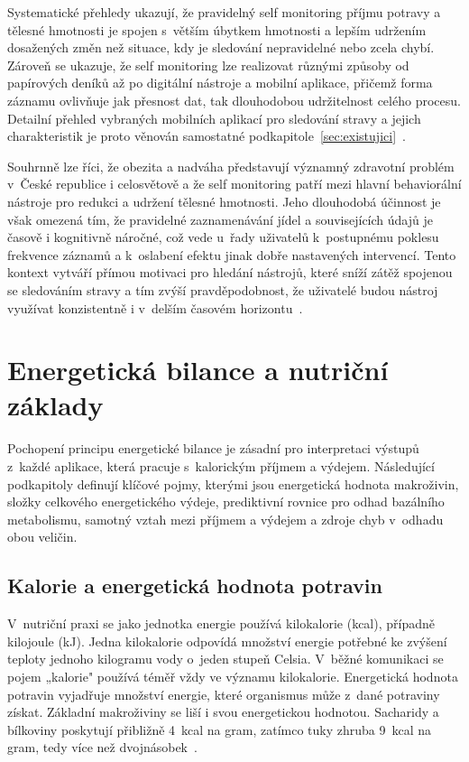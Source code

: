 Systematické přehledy ukazují, že pravidelný self monitoring příjmu potravy a tělesné hmotnosti je spojen s~větším úbytkem hmotnosti a lepším udržením dosažených změn než situace, kdy je sledování nepravidelné nebo zcela chybí.
Zároveň se ukazuje, že self monitoring lze realizovat různými způsoby od papírových deníků až po digitální nástroje a mobilní aplikace, přičemž forma záznamu ovlivňuje jak přesnost dat, tak dlouhodobou udržitelnost celého procesu.
Detailní přehled vybraných mobilních aplikací pro sledování stravy a jejich charakteristik je proto věnován samostatné podkapitole~\ref{sec:existujici}~\cite{ang2021efficacy,raber2021systematicReview}.

Souhrnně lze říci, že obezita a nadváha představují významný zdravotní problém v~České republice i celosvětově a že self monitoring patří mezi hlavní behaviorální nástroje pro redukci a udržení tělesné hmotnosti.
Jeho dlouhodobá účinnost je však omezená tím, že pravidelné zaznamenávání jídel a souvisejících údajů je časově i kognitivně náročné, což vede u~řady uživatelů k~postupnému poklesu frekvence záznamů a k~oslabení efektu jinak dobře nastavených intervencí.
Tento kontext vytváří přímou motivaci pro hledání nástrojů, které sníží zátěž spojenou se sledováním stravy a tím zvýší pravděpodobnost, že uživatelé budou nástroj využívat konzistentně i v~delším časovém horizontu~\cite{theodorakis2025humanEnergyBalance,pujia2025roleMobileApps,crane2023patterns}.

\section{Energetická bilance a nutriční základy}
\label{sec:energetickaBilance}

Pochopení principu energetické bilance je zásadní pro interpretaci výstupů z~každé aplikace, která pracuje s~kalorickým příjmem a výdejem.
Následující podkapitoly definují klíčové pojmy, kterými jsou energetická hodnota makroživin, složky celkového energetického výdeje, prediktivní rovnice pro odhad bazálního metabolismu, samotný vztah mezi příjmem a výdejem a zdroje chyb v~odhadu obou veličin.

\subsection{Kalorie a energetická hodnota potravin}
\label{subsec:kalorie}

V~nutriční praxi se jako jednotka energie používá kilokalorie (kcal), případně kilojoule (kJ).
Jedna kilokalorie odpovídá množství energie potřebné ke zvýšení teploty jednoho kilogramu vody o~jeden stupeň Celsia.
V~běžné komunikaci se pojem „kalorie" používá téměř vždy ve významu kilokalorie.
Energetická hodnota potravin vyjadřuje množství energie, které organismus může z~dané potraviny získat.
Základní makroživiny se liší i svou energetickou hodnotou.
Sacharidy a bílkoviny poskytují přibližně 4~kcal na gram, zatímco tuky zhruba 9~kcal na gram, tedy více než dvojnásobek~\cite{theodorakis2025humanEnergyBalance}.

